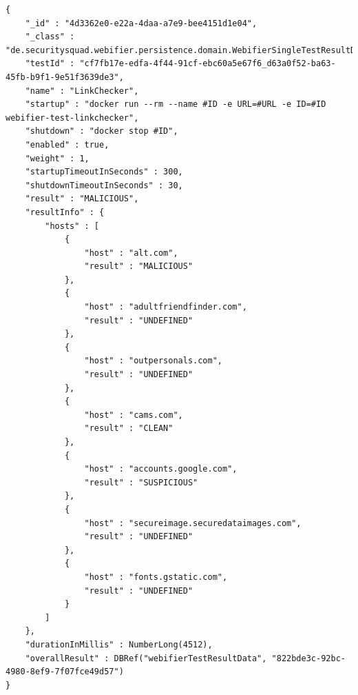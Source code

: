 \begin{scriptsize}
\begin{lstlisting}
{
    "_id" : "4d3362e0-e22a-4daa-a7e9-bee4151d1e04",
    "_class" : "de.securitysquad.webifier.persistence.domain.WebifierSingleTestResultData",
    "testId" : "cf7fb17e-edfa-4f44-91cf-ebc60a5e67f6_d63a0f52-ba63-45fb-b9f1-9e51f3639de3",
    "name" : "LinkChecker",
    "startup" : "docker run --rm --name #ID -e URL=#URL -e ID=#ID webifier-test-linkchecker",
    "shutdown" : "docker stop #ID",
    "enabled" : true,
    "weight" : 1,
    "startupTimeoutInSeconds" : 300,
    "shutdownTimeoutInSeconds" : 30,
    "result" : "MALICIOUS",
    "resultInfo" : {
        "hosts" : [
            {
                "host" : "alt.com",
                "result" : "MALICIOUS"
            },
            {
                "host" : "adultfriendfinder.com",
                "result" : "UNDEFINED"
            },
            {
                "host" : "outpersonals.com",
                "result" : "UNDEFINED"
            },
            {
                "host" : "cams.com",
                "result" : "CLEAN"
            },
            {
                "host" : "accounts.google.com",
                "result" : "SUSPICIOUS"
            },
            {
                "host" : "secureimage.securedataimages.com",
                "result" : "UNDEFINED"
            },
            {
                "host" : "fonts.gstatic.com",
                "result" : "UNDEFINED"
            }
        ]
    },
    "durationInMillis" : NumberLong(4512),
    "overallResult" : DBRef("webifierTestResultData", "822bde3c-92bc-4980-8ef9-7f07fce49d57")
}
\end{lstlisting}
\end{scriptsize}

\newpage

